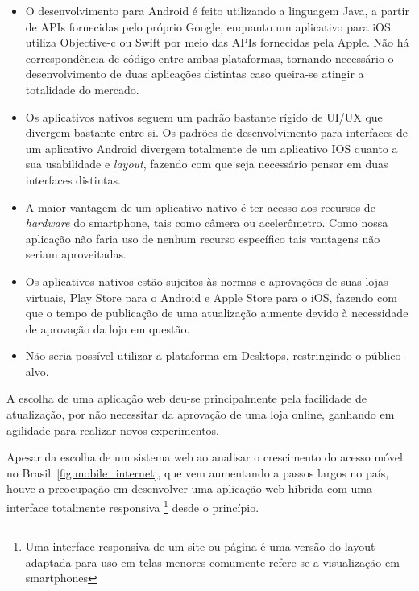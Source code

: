 \begin{itemize}
\item O desenvolvimento para Android é feito utilizando a linguagem Java, a partir de APIs fornecidas pelo próprio Google, enquanto um aplicativo para iOS utiliza Objective-c ou Swift por meio das APIs fornecidas pela Apple. Não há correspondência de código entre ambas plataformas, tornando necessário o desenvolvimento de duas aplicações distintas caso queira-se atingir a totalidade do mercado.
\item Os aplicativos nativos seguem um padrão bastante rígido de UI/UX que divergem bastante entre si. Os padrões de desenvolvimento para interfaces de um aplicativo Android divergem totalmente de um aplicativo IOS quanto a sua usabilidade e \emph{layout}, fazendo com que seja necessário pensar em duas interfaces distintas.
\item A maior vantagem de um aplicativo nativo é ter acesso aos recursos de \emph{hardware} do smartphone, tais como câmera ou acelerômetro. Como nossa aplicação não faria uso de nenhum recurso específico tais vantagens não seriam aproveitadas.
\item Os aplicativos nativos estão sujeitos às normas e aprovações de suas lojas virtuais, Play Store para o Android e Apple Store para o iOS, fazendo com que o tempo de publicação de uma atualização aumente devido à necessidade de aprovação da loja em questão.
\item Não seria possível utilizar a plataforma em Desktops, restringindo o público-alvo.
\end{itemize}
\par A escolha de uma aplicação web deu-se principalmente pela facilidade de atualização, por não necessitar da aprovação de uma loja online, ganhando em agilidade para realizar novos experimentos.
\par Apesar da escolha de um sistema web ao analisar o crescimento do acesso móvel no Brasil~\ref{fig:mobile_internet}, que vem aumentando a passos largos no país, houve a preocupação em desenvolver uma aplicação web híbrida com uma interface totalmente responsiva \footnote{ Uma interface responsiva de um site ou página é uma versão do layout adaptada para uso em telas menores comumente refere-se a visualização em smartphones} desde o princípio.
